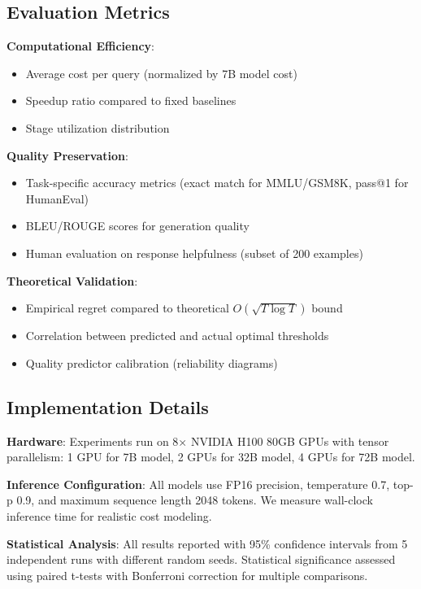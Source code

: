 \documentclass{article}
\theoremstyle{plain}
\theoremstyle{definition}
\theoremstyle{remark}
\begin{document}
\subsection{Evaluation Metrics}

\textbf{Computational Efficiency}:
\begin{itemize}
\item Average cost per query (normalized by 7B model cost)
\item Speedup ratio compared to fixed baselines
\item Stage utilization distribution
\end{itemize}

\textbf{Quality Preservation}:
\begin{itemize}
\item Task-specific accuracy metrics (exact match for MMLU/GSM8K, pass@1 for HumanEval)
\item BLEU/ROUGE scores for generation quality
\item Human evaluation on response helpfulness (subset of 200 examples)
\end{itemize}

\textbf{Theoretical Validation}:
\begin{itemize}
\item Empirical regret compared to theoretical $O(\sqrt{T \log T})$ bound
\item Correlation between predicted and actual optimal thresholds
\item Quality predictor calibration (reliability diagrams)
\end{itemize}

\subsection{Implementation Details}

\textbf{Hardware}: Experiments run on 8× NVIDIA H100 80GB GPUs with tensor parallelism: 1 GPU for 7B model, 2 GPUs for 32B model, 4 GPUs for 72B model.

\textbf{Inference Configuration}: All models use FP16 precision, temperature 0.7, top-p 0.9, and maximum sequence length 2048 tokens. We measure wall-clock inference time for realistic cost modeling.

\textbf{Statistical Analysis}: All results reported with 95\% confidence intervals from 5 independent runs with different random seeds. Statistical significance assessed using paired t-tests with Bonferroni correction for multiple comparisons.
\end{document}
